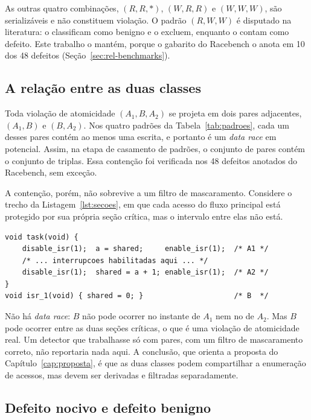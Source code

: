 As outras quatro combinações, $(R,R,\ast)$, $(W,R,R)$ e $(W,W,W)$, são
serializáveis e não constituem violação. O padrão $(R,W,W)$ é disputado na
literatura:  o classificam como benigno e o excluem, enquanto
 o contam como defeito. Este trabalho o mantém, porque o
gabarito do Racebench o anota em 10 dos 48 defeitos
(Seção~\ref{sec:rel-benchmarks}).

\subsection{A relação entre as duas classes}

Toda violação de atomicidade $(A_1, B, A_2)$ se projeta em dois pares
adjacentes, $(A_1, B)$ e $(B, A_2)$. Nos quatro padrões da
Tabela~\ref{tab:padroes}, cada um desses pares contém ao menos uma escrita, e
portanto é um \textit{data race} em potencial. Assim, na etapa de casamento de
padrões, o conjunto de pares contém o conjunto de triplas. Essa contenção foi
verificada nos 48 defeitos anotados do Racebench, sem exceção.

A contenção, porém, não sobrevive a um filtro de mascaramento. Considere o
trecho da Listagem~\ref{lst:secoes}, em que cada acesso do fluxo principal está
protegido por sua própria seção crítica, mas o intervalo entre elas não está.

\begin{lstlisting}[caption={Violação de atomicidade sem \textit{data race}},label={lst:secoes}]
void task(void) {
    disable_isr(1);  a = shared;     enable_isr(1);  /* A1 */
    /* ... interrupcoes habilitadas aqui ... */
    disable_isr(1);  shared = a + 1; enable_isr(1);  /* A2 */
}
void isr_1(void) { shared = 0; }                     /* B  */
\end{lstlisting}

Não há \textit{data race}: $B$ não pode ocorrer no instante de $A_1$ nem no de
$A_2$. Mas $B$ pode ocorrer entre as duas seções críticas, o que é uma violação
de atomicidade real. Um detector que trabalhasse só com pares, com um filtro de
mascaramento correto, não reportaria nada aqui. A conclusão, que orienta a
proposta do Capítulo~\ref{cap:proposta}, é que as duas classes podem
compartilhar a enumeração de acessos, mas devem ser derivadas e filtradas
separadamente.

\subsection{Defeito nocivo e defeito benigno}

